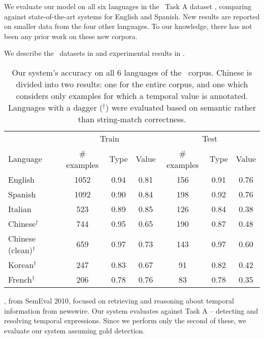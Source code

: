 We evaluate our model on all six languages in the \tempeval\ Task A dataset
  \cite{key:2010verhagen-tempeval}, comparing against state-of-the-art
  systems for English and Spanish.
New results are reported on smaller data from the four other languages.
To our knowledge, there has not been any prior work on these new corpora.

We describe the \tempeval\ datasets in  and experimental
  results in .


\begin{table*}[ht]
	\begin{center}
	\begin{tabular}{|l|c|c|c|c|c|c|}
		\hline
		       & \multicolumn{3}{c|}{Train} & \multicolumn{3}{c|}{Test} \\
		Language & \# examples & Type & Value  & \# examples & Type & Value \\
		\hline
		English                        & 1052 & 0.94 & 0.81  & 156 & 0.91 & 0.76 \\
		Spanish                        & 1092 & 0.90 & 0.84  & 198 & 0.92 & 0.76 \\
		Italian                        & 523  & 0.89 & 0.85  & 126 & 0.84 & 0.38 \\
		Chinese$^\dagger$              & 744  & 0.95 & 0.65  & 190 & 0.87 & 0.48 \\
		Chinese (clean)$^\dagger$      & 659  & 0.97 & 0.73  & 143 & 0.97 & 0.60 \\
		Korean$^\dagger$               & 247  & 0.83 & 0.67  & 91  & 0.82 & 0.42 \\
		French$^\dagger$               & 206  & 0.78 & 0.76  & 83  & 0.78 & 0.35 \\
		\hline
	\end{tabular}
	\caption{
    Our system's accuracy on all 6 languages of the \tempeval\ corpus.
    Chinese is divided into two results: one for the entire corpus, and one
      which considers only examples for which a temporal value is annotated.
    Languages with a dagger ($^\dagger$) were evaluated based on semantic
      rather than string-match correctness.
		\label{tab:results-all}
	}
	\end{center}
\end{table*}

\tempeval, from SemEval 2010, focused on retrieving and reasoning
  about temporal information from newswire.
Our system evaluates against Task A -- detecting and resolving temporal
  expressions.
Since we perform only the second of these, we evaluate our system
	assuming gold detection.

